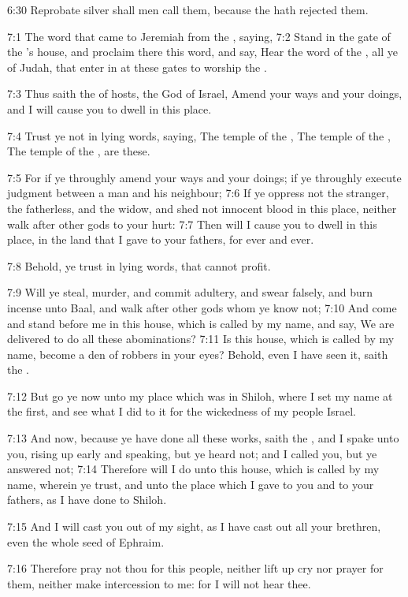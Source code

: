 6:30 Reprobate silver shall men call them, because the \LORD hath
rejected them.

7:1 The word that came to Jeremiah from the \LORD, saying, 7:2 Stand in
the gate of the \LORD's house, and proclaim there this word, and say,
Hear the word of the \LORD, all ye of Judah, that enter in at these
gates to worship the \LORD.

7:3 Thus saith the \LORD of hosts, the God of Israel, Amend your ways
and your doings, and I will cause you to dwell in this place.

7:4 Trust ye not in lying words, saying, The temple of the \LORD, The
temple of the \LORD, The temple of the \LORD, are these.

7:5 For if ye throughly amend your ways and your doings; if ye
throughly execute judgment between a man and his neighbour; 7:6 If ye
oppress not the stranger, the fatherless, and the widow, and shed not
innocent blood in this place, neither walk after other gods to your
hurt: 7:7 Then will I cause you to dwell in this place, in the land
that I gave to your fathers, for ever and ever.

7:8 Behold, ye trust in lying words, that cannot profit.

7:9 Will ye steal, murder, and commit adultery, and swear falsely, and
burn incense unto Baal, and walk after other gods whom ye know not;
7:10 And come and stand before me in this house, which is called by my
name, and say, We are delivered to do all these abominations?  7:11 Is
this house, which is called by my name, become a den of robbers in
your eyes? Behold, even I have seen it, saith the \LORD.

7:12 But go ye now unto my place which was in Shiloh, where I set my
name at the first, and see what I did to it for the wickedness of my
people Israel.

7:13 And now, because ye have done all these works, saith the \LORD,
and I spake unto you, rising up early and speaking, but ye heard not;
and I called you, but ye answered not; 7:14 Therefore will I do unto
this house, which is called by my name, wherein ye trust, and unto the
place which I gave to you and to your fathers, as I have done to
Shiloh.

7:15 And I will cast you out of my sight, as I have cast out all your
brethren, even the whole seed of Ephraim.

7:16 Therefore pray not thou for this people, neither lift up cry nor
prayer for them, neither make intercession to me: for I will not hear
thee.

